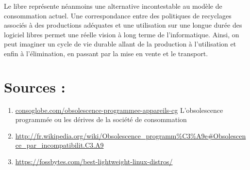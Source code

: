 \documentclass[10pt]{../fiche}
\begin{document}
Le libre représente néanmoins une alternative incontestable au modèle de
consommation actuel. Une correspondance entre des politiques de recyclages
associés à des productions adéquates et une utilisation sur une longue durée
des logiciel libres permet une réelle vision à long terme de l'informatique.
Ainsi, on peut imaginer un cycle de vie durable allant de la production à
l'utilisation et enfin à l'élimination, en passant par la mise en vente et le
transport.

\section*{Sources :}
\begin{enumerate}
\item \url{consoglobe.com/obsolescence-programmee-appareils-cg}
\textsf{L'obsolescence programmée ou les dérives de la société de consommation}
\item \url{http://fr.wikipedia.org/wiki/Obsolescence_programm\%C3\%A9e#Obsolescence_par_incompatibilit.C3.A9}
\item \url{https://fossbytes.com/best-lightweight-linux-distros/}
\end{enumerate}
\end{document}
